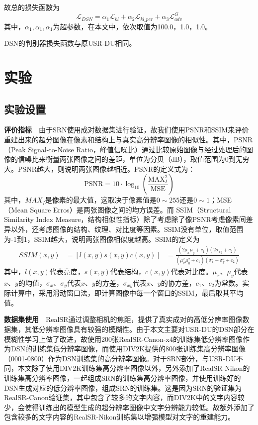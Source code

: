 故总的损失函数为
\begin{equation}
    \mathcal{L}_{DSN} = \alpha_1\mathcal{L}_{kl}+\alpha_2\mathcal{L}_{kl\_per}+\alpha_3\mathcal{L}_{adv}^G
\end{equation}
其中，$\alpha_1,\alpha_1,\alpha_1$为超参数，在本文中，依次取值为100.0，1.0，1.0。

DSN的判别器损失函数与原USR-DU相同。
\section{实验}
\subsection{实验设置}
\noindent\textbf{评价指标}\ \ 由于SRN使用成对数据集进行验证，故我们使用PSNR和SSIM来评价重建出来的超分图像在像素和结构上与真实高分辨率图像的相似性。其中，PSNR（Peak Signal-to-Noise Ratio，峰值信噪比）通过比较原始图像与经过处理后的图像的信噪比来衡量两张图像之间的差距，单位为分贝（dB），取值范围为0到无穷大。PSNR越大，则说明两张图像越相近。PSNR的定义式为：
\begin{equation}
    \text{PSNR}=10\cdot \log_{10}(\frac{\text{MAX}_I^2}{\text{MSE}})
\end{equation}
其中，$MAX_I$是像素的最大值，这取决于像素值是$0\sim 255$还是$0\sim 1$；MSE（Mean Square Erros）是两张图像之间的均方误差。而 SSIM\cite{wang2002universal}（Structural Similarity Index Measure，结构相似性指标）除了考虑除了像PSNR考虑像素间差异以外，还考虑图像的结构、纹理、对比度等因素。SSIM没有单位，取值范围为-1到1，SSIM越大，说明两张图像相似度越高。SSIM的定义为
\begin{equation}
    \begin{aligned}
        SSIM(x,y)&=[l(x,y)s(x,y)c(x,y)]
                 &=\frac{(2\mu_x\mu_y+c_1)(2\sigma_{xy}+c_2)}{(\mu_x^2\mu_y^2+c_1)(\sigma_x^2+\sigma_y^2+c_2)}
    \end{aligned}
\end{equation}
其中，$l(x,y)$代表亮度，$s(x,y)$代表结构，$c(x,y)$代表对比度。$\mu_x$、$\mu_y$代表$x、y$的均值，$\sigma_x$、$\sigma_y$代表$x、y$的方差，$\sigma_{xy}$代表$x、y$的协方差，$c_1$、$c_2$为常数。实际计算中，采用滑动窗口法，即计算图像中每一个窗口的SSIM，最后取其平均值。

\noindent\textbf{数据集使用}\ \ RealSR\cite{cai2019toward}通过调整相机的焦距，提供了真实成对的高低分辨率图像数据集，其低分辨率图像具有较强的模糊性。由于本文主要对USR-DU的DSN部分在模糊性学习上做了改进，故使用200张RealSR-Canon-x4的训练集低分辨率图像作为DSN的训练集低分辨率图像，而使用DIV2K\cite{Agustsson_2017_CVPR_Workshops}提供的800张训练集高分辨率图像（0001-0800）作为DSN训练集的高分辨率图像。对于SRN部分，与USR-DU不同，本文除了使用DIV2K训练集高分辨率图像以外，另外添加了RealSR-Nikon的训练集高分辨率图像，一起组成SRN的训练集高分辨率图像，并使用训练好的DSN生成对应的低分辨率图像，组成SRN的训练集。这是因为SRN的验证集为RealSR-Canon验证集，其中包含了较多的文字内容，而DIV2K中的文字内容较少，会使得训练出的模型生成的超分辨率图像中文字分辨能力较低。故额外添加了包含较多的文字内容的RealSR-Nikon训练集以增强模型对文字的重建能力。

